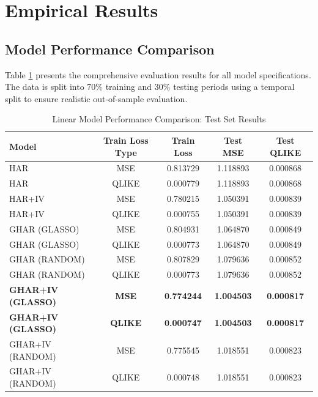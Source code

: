 \documentclass[12pt,a4paper]{article}
\begin{document}
\section{Empirical Results}

\subsection{Model Performance Comparison}

Table \ref{tab:results} presents the comprehensive evaluation results for all model specifications. The data is split into 70\% training and 30\% testing periods using a temporal split to ensure realistic out-of-sample evaluation.
\begin{table}[htbp]
\centering
\caption{Linear Model Performance Comparison: Test Set Results}
\label{tab:results}
\begin{tabular}{lcccc}
\toprule
Model & Train Loss Type & Train Loss & Test MSE & Test QLIKE \\
\midrule
HAR & MSE & 0.813729 & 1.118893 & 0.000868 \\
HAR & QLIKE & 0.000779 & 1.118893 & 0.000868 \\
\midrule
HAR+IV & MSE & 0.780215 & 1.050391 & 0.000839 \\
HAR+IV & QLIKE & 0.000755 & 1.050391 & 0.000839 \\
\midrule
GHAR (GLASSO) & MSE & 0.804931 & 1.064870 & 0.000849 \\
GHAR (GLASSO) & QLIKE & 0.000773 & 1.064870 & 0.000849 \\
GHAR (RANDOM) & MSE & 0.807829 & 1.079636 & 0.000852 \\
GHAR (RANDOM) & QLIKE & 0.000773 & 1.079636 & 0.000852 \\
\midrule
\textbf{GHAR+IV (GLASSO)} & \textbf{MSE} & \textbf{0.774244} & \textbf{1.004503} & \textbf{0.000817} \\
\textbf{GHAR+IV (GLASSO)} & \textbf{QLIKE} & \textbf{0.000747} & \textbf{1.004503} & \textbf{0.000817} \\
GHAR+IV (RANDOM) & MSE & 0.775545 & 1.018551 & 0.000823 \\
GHAR+IV (RANDOM) & QLIKE & 0.000748 & 1.018551 & 0.000823 \\
\bottomrule
\end{tabular}
\end{table}
\end{document}
